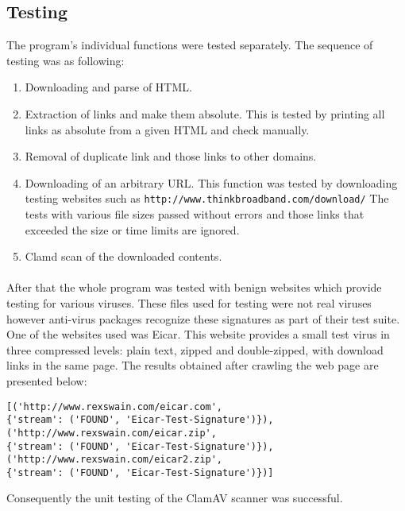 \subsection{Testing}
The program's individual functions were tested separately. The sequence of 
testing was as following:
\begin{enumerate}
\item Downloading and parse of HTML.
\item Extraction of links and make them absolute.
This is tested by printing all links as absolute from a given HTML and check 
manually.
\item Removal of duplicate link and those links to other domains.
\item Downloading of an arbitrary URL.
This function was tested by downloading testing websites such as
\verb`http://www.thinkbroadband.com/download/`
The tests with various file 
sizes passed without errors and those links that exceeded the size or time limits are 
ignored. 
\item Clamd scan of the downloaded contents. 
\end{enumerate}
\paragraph{}
After that the whole program was tested with benign websites which provide 
testing for various viruses. These files used for testing were not real viruses however anti-virus packages recognize these signatures 
as part of their test suite. 
One of the websites used was Eicar\cite{eicar}. This website provides a small test 
virus in three compressed levels: plain text, zipped and double-zipped, with 
download links in the same page. The results obtained after 
crawling the web page are presented below:
\begin{verbatim}
[('http://www.rexswain.com/eicar.com', 
{'stream': ('FOUND', 'Eicar-Test-Signature')}), 
('http://www.rexswain.com/eicar.zip', 
{'stream': ('FOUND', 'Eicar-Test-Signature')}), 
('http://www.rexswain.com/eicar2.zip', 
{'stream': ('FOUND', 'Eicar-Test-Signature')})]
\end{verbatim}
Consequently the unit testing of the ClamAV scanner was successful. 
